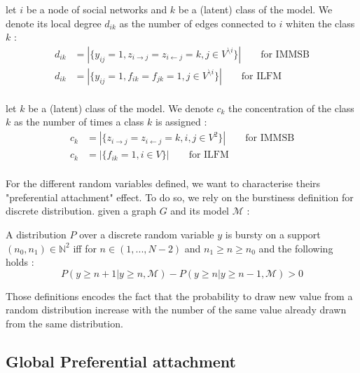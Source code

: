 \documentclass{article}
\begin{document}
\begin{definition}
    let $i$ be a node of social networks and $k$ be a (latent) class of the model. We denote its local degree $d_{ik}$ as the number of edges connected to $i$ whiten the class $k$ : 
    \begin{align}
        d_{ik} &= |\{y_{ij}=1, z_{i\rightarrow j}=z_{i\leftarrow j}=k,  j \in V^{\setminus i}\}| \qquad \textrm{for IMMSB} \\
        d_{ik} &= |\{y_{ij}=1, f_{ik}=f_{jk}=1,  j \in V^{\setminus i}\}| \qquad \textrm{for ILFM} \\
    \end{align}
\end{definition}

\begin{definition}
    let $k$ be a (latent) class of the model. We denote $c_k$ the concentration of the class $k$ as the number of times a class $k$ is assigned : 
    \begin{align}
        c_{k} &= |\{ z_{i\rightarrow j}=z_{i\leftarrow j}=k,  i, j \in V^2\}| \qquad \textrm{for IMMSB} \\
        c_{k} &= |\{ f_{ik}=1,  i \in V\}| \qquad \textrm{for ILFM} \\
    \end{align}
\end{definition}


For the different random variables defined, we want to characterise theirs "preferential attachment" effect. To do so, we rely on the burstiness definition for discrete distribution. given a graph $G$ and its model $\mathcal{M}$  :

\begin{definition} \label{discrete_burstiness}
    A distribution $P$ over a discrete random variable $y$ is bursty on a support $(n_0, n_1) \in \mathbb{N}^2$ iff for $n \in (1,..., N-2)$ and $n_1 \geq  n \geq n_0$ and the following holds : 
    \begin{equation}
        P(y \geq n+1 | y \geq n, \mathcal{M}) - P(y \geq n | y \geq n-1, \mathcal{M}) > 0
    \end{equation}
\end{definition}

Those definitions encodes the fact that the probability to draw new value from a random distribution increase with the number of the same value already drawn from the same distribution.

\subsection{Global Preferential attachment}
\end{document}

